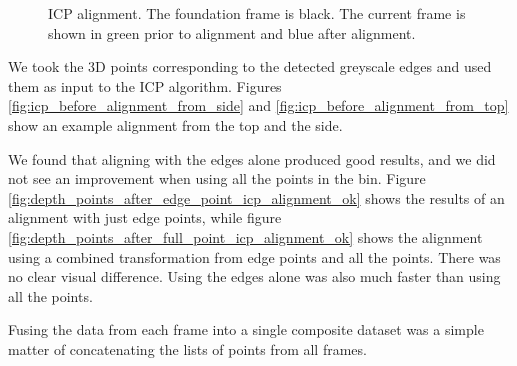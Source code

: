 \documentclass[12pt,a4paper,onecolumn]{article}
\begin{document}
\begin{figure}[h]
    \centering
      \caption{ICP alignment.  The foundation frame is black.  The current frame is shown in green prior to alignment and blue after alignment.}
\end{figure}

We took the 3D points corresponding to the detected greyscale edges and used them as input to the ICP algorithm.  Figures \ref{fig:icp_before_alignment_from_side} and \ref{fig:icp_before_alignment_from_top} show an example alignment from the top and the side.

We found that aligning with the edges alone produced good results, and we did not see an improvement when using all the points in the bin.  Figure \ref{fig:depth_points_after_edge_point_icp_alignment_ok} shows the results of an alignment with just edge points, while figure \ref{fig:depth_points_after_full_point_icp_alignment_ok} shows the alignment using a combined transformation from edge points and all the points.  There was no clear visual difference.  Using the edges alone was also much faster than using all the points.

Fusing the data from each frame into a single composite dataset was a simple matter of concatenating the lists of points from all frames.
\end{document}

